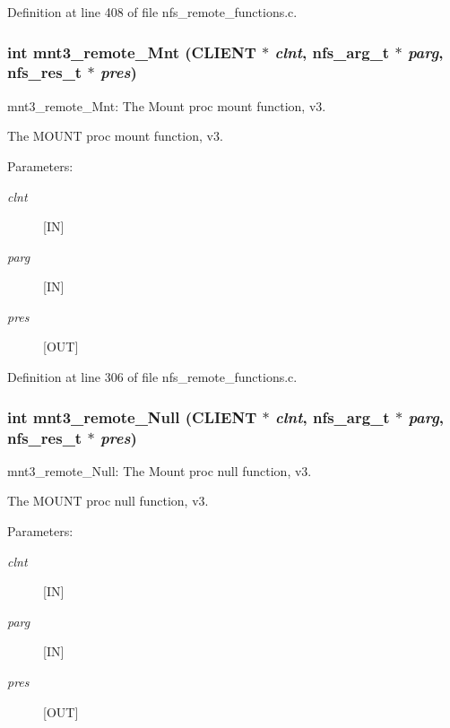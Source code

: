 Definition at line 408 of file nfs\_\-remote\_\-functions.c.
\subsubsection[{mnt3\_\-remote\_\-Mnt}]{\setlength{\rightskip}{0pt plus 5cm}int mnt3\_\-remote\_\-Mnt (CLIENT $\ast$ {\em clnt}, \/  nfs\_\-arg\_\-t $\ast$ {\em parg}, \/  nfs\_\-res\_\-t $\ast$ {\em pres})}\label{group__MNTprocs_gd9f77ceb646cee21165ce3318f0fe54b}


mnt3\_\-remote\_\-Mnt: The Mount proc mount function, v3.

The MOUNT proc mount function, v3.

\begin{Desc}
\item[Parameters:]
\begin{description}
\item[{\em clnt}][IN] \item[{\em parg}][IN] \item[{\em pres}][OUT] \end{description}
\end{Desc}


Definition at line 306 of file nfs\_\-remote\_\-functions.c.
\subsubsection[{mnt3\_\-remote\_\-Null}]{\setlength{\rightskip}{0pt plus 5cm}int mnt3\_\-remote\_\-Null (CLIENT $\ast$ {\em clnt}, \/  nfs\_\-arg\_\-t $\ast$ {\em parg}, \/  nfs\_\-res\_\-t $\ast$ {\em pres})}\label{group__MNTprocs_g3d78bf1d679b67f59ef6ce13bef6c202}


mnt3\_\-remote\_\-Null: The Mount proc null function, v3.

The MOUNT proc null function, v3.

\begin{Desc}
\item[Parameters:]
\begin{description}
\item[{\em clnt}][IN] \item[{\em parg}][IN] \item[{\em pres}][OUT] \end{description}
\end{Desc}


